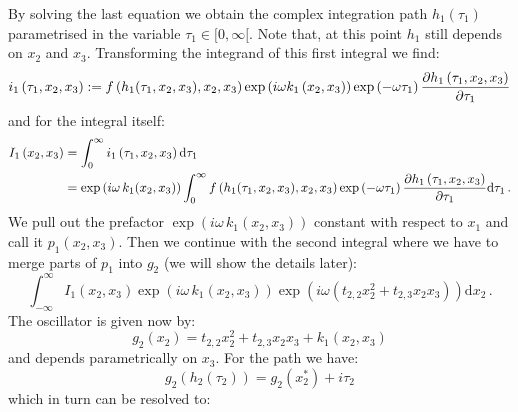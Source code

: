 \documentclass[a4paper,10pt]{article}
\begin{document}
By solving the last equation we obtain the complex integration path
$h_1\left(\tau_1\right)$ parametrised in the variable $\tau_1 \in [0,\infty[$.
Note that, at this point $h_1$ still depends on $x_2$ and $x_3$.
Transforming the integrand of this first integral we find:
\begin{equation*}
 i_1\left(\tau_1, x_2, x_3\right) := f\left(h_1(\tau_1, x_2, x_3), x_2, x_3\right)
                                     \exp\left(i \omega k_1\left(x_2, x_3\right) \right)
                                     \exp\left(- \omega \tau_1 \right)
                                     \frac{\partial h_1\left(\tau_1, x_2, x_3\right)}{\partial \tau_1}
\end{equation*}
and for the integral itself:
\begin{equation*}
\begin{split}
  I_1\left(x_2, x_3\right) & = \int_0^{\infty} i_1\left(\tau_1, x_2, x_3\right) \mathrm{d}\tau_1 \\
                           & = \exp\left(i \omega \,k_1\!\left(x_2, x_3\right) \right)
                               \int_0^{\infty} f\left(h_1(\tau_1, x_2, x_3), x_2, x_3\right)
                                               \exp\left(- \omega \tau_1 \right)
                                               \frac{\partial h_1\left(\tau_1, x_2, x_3\right)}{\partial \tau_1}
                               \mathrm{d}\tau_1 \,.
\end{split}
\end{equation*}
We pull out the prefactor $\exp\left(i \omega \,k_1\!\left(x_2, x_3\right) \right)$
constant with respect to $x_1$ and call it $p_1\left(x_2, x_3\right)$.
Then we continue with the second integral where we have to merge parts of
$p_1$ into $g_2$ (we will show the details later):
\begin{equation}
  \int_{-\infty}^{\infty} I_1\left(x_2, x_3\right)
                          \exp\left(i \omega \,k_1\!\left(x_2, x_3\right) \right)
                          \exp\left(i \omega \left(t_{2,2} x_2^2 + t_{2,3} x_2 x_3\right) \right)
  \mathrm{d}x_2 \,.
\end{equation}
The oscillator is given now by:
\begin{equation}
 g_2(x_2) = t_{2,2} x_2^2 + t_{2,3} x_2 x_3 + k_1(x_2, x_3)
\end{equation}
and depends parametrically on $x_3$. For the path we have:
\begin{equation}
  g_2\left(h_2(\tau_2)\right) = g_2\left(x_2^{*}\right) + i \tau_2
\end{equation}
which in turn can be resolved to:
\end{document}
